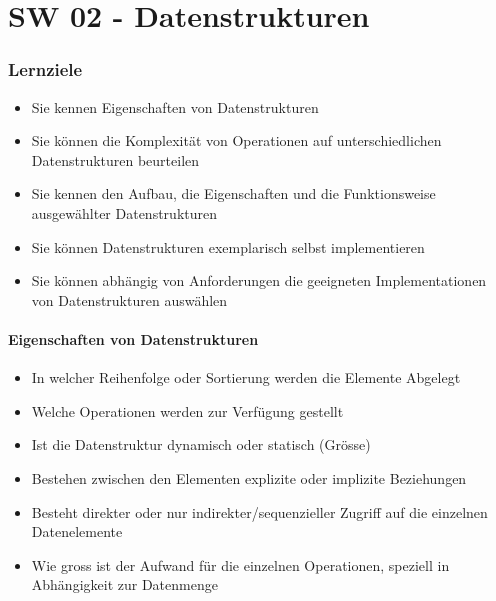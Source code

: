\part{SW 02 - Datenstrukturen}
\section{Lernziele}
\begin{itemize}
    \item Sie kennen Eigenschaften von Datenstrukturen
    \item Sie können die Komplexität von Operationen auf unterschiedlichen Datenstrukturen beurteilen
    \item Sie kennen den Aufbau, die Eigenschaften und die Funktionsweise ausgewählter Datenstrukturen
    \item Sie können Datenstrukturen exemplarisch selbst implementieren
    \item Sie können abhängig von Anforderungen die geeigneten Implementationen von Datenstrukturen auswählen
\end{itemize}

\subsection{Eigenschaften von Datenstrukturen}
\begin{itemize}
    \item In welcher Reihenfolge oder Sortierung werden die Elemente Abgelegt
    \item Welche Operationen werden zur Verfügung gestellt
    \item Ist die Datenstruktur dynamisch oder statisch (Grösse)
    \item Bestehen zwischen den Elementen explizite oder implizite Beziehungen
    \item Besteht direkter oder nur indirekter/sequenzieller Zugriff auf die einzelnen Datenelemente
    \item Wie gross ist der Aufwand für die einzelnen Operationen, speziell in Abhängigkeit zur Datenmenge
\end{itemize}

